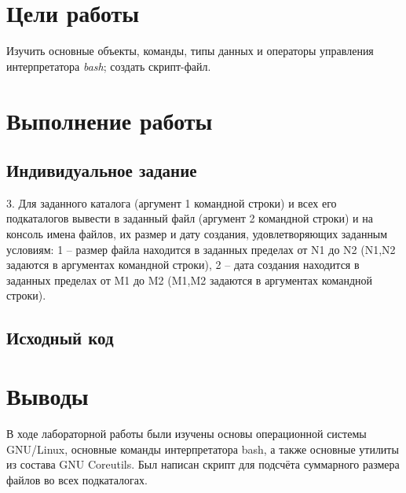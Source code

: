 \section{Цели работы}
\label{sec:target}

Изучить основные объекты, команды, типы данных и операторы управления интерпретатора \textit{bash}; создать скрипт-файл.

\section{Выполнение работы}
\label{sec:job}

\subsection{Индивидуальное задание}
\label{sec:job:task}

3. Для заданного каталога (аргумент 1 командной строки) и всех его
подкаталогов вывести в заданный файл (аргумент 2 командной строки) и на
консоль имена файлов, их размер и дату создания, удовлетворяющих заданным
условиям: 1 – размер файла находится в заданных пределах от N1 до N2 (N1,N2
задаются в аргументах командной строки), 2 – дата создания находится в
заданных пределах от M1 до M2 (M1,M2 задаются в аргументах командной
строки).

\subsection{Исходный код}
\label{sec:job:code}



\section{Выводы}
\label{sec:out}

В ходе лабораторной работы были изучены основы операционной системы GNU/Linux, основные команды интерпретатора bash, а также основные утилиты из состава GNU Coreutils.
Был написан скрипт для подсчёта суммарного размера файлов во всех подкаталогах.
